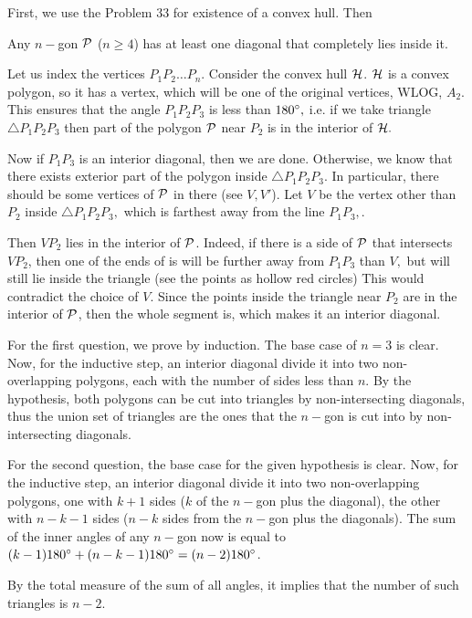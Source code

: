 \documentclass{article}
\begin{document}
\begin{soln}
    First, we use the Problem 33 for existence of a convex hull. Then
    \begin{claim*}
        Any $n-$gon $\cal{P}$ ($n \ge 4$) has at least one diagonal that completely lies inside it.
    \end{claim*}
    \begin{subproof}
        Let us index the vertices  $P_1P_2 \ldots P_n.$ Consider the convex hull $\cal{H}$. 
        $\cal{H}$ is a convex polygon, so it has a vertex, which will be one of the original vertices, WLOG, $A_2$.
        This ensures that the angle $P_1 P_2 P_3$ is less than $180^\circ,$ i.e. if we take triangle $\triangle P_1 P_2 P_3$
        then part of the polygon $\cal{P}$ near $P_2$ is in the interior of $\cal{H}.$  
       
        Now if $P_1 P_3$ is an interior diagonal, then we are done.
        Otherwise, we know that there exists exterior part of the polygon inside $\triangle P_1 P_2 P_3.$
        In particular, there should be some vertices of $\cal{P}$ in there (see $V, V'$).
        Let $V$ be the vertex other than $P_2$ inside $\triangle P_1 P_2 P_3,$
        which is farthest away from the line $P_1 P_3,$.
        
        Then $VP_2$ lies in the interior of $\cal{P}$. Indeed, if there is a side of $\cal{P}$ that intersects $VP_2$,
        then one of the ends of is will be further away from $P_1 P_3$ than $V,$ but will still lie inside the triangle (see the points as hollow red circles)
        This would contradict the choice of $V.$
        Since the points inside the triangle near $P_2$ are in the interior of $\cal{P}$,
        then the whole segment is, which makes it an interior diagonal.
    \end{subproof}

    For the first question, we prove by induction. The base case of $n=3$ is clear.
    Now, for the inductive step, an interior diagonal divide it into two non-overlapping polygons, each with the number of sides less than $n.$
    By the hypothesis, both polygons can be cut into triangles by non-intersecting diagonals, thus the union set of triangles are the ones
    that the $n-$gon is cut into by non-intersecting diagonals.

    For the second question, the base case for the given hypothesis is clear.
    Now, for the inductive step, an interior diagonal divide it into two non-overlapping polygons, one with $k+1$ sides ($k$ of the $n-$gon plus the diagonal),
    the other with $n-k-1$ sides ($n-k$ sides from the $n-$gon plus the diagonals). 
    The sum of the inner angles of any $n-$gon now is equal to $(k-1) 180^\circ + (n-k-1) 180^\circ = (n-2)180^\circ$.
    
    By the total measure of the sum of all angles, it implies that the number of such triangles is $n-2.$
\end{soln}
\end{document}
